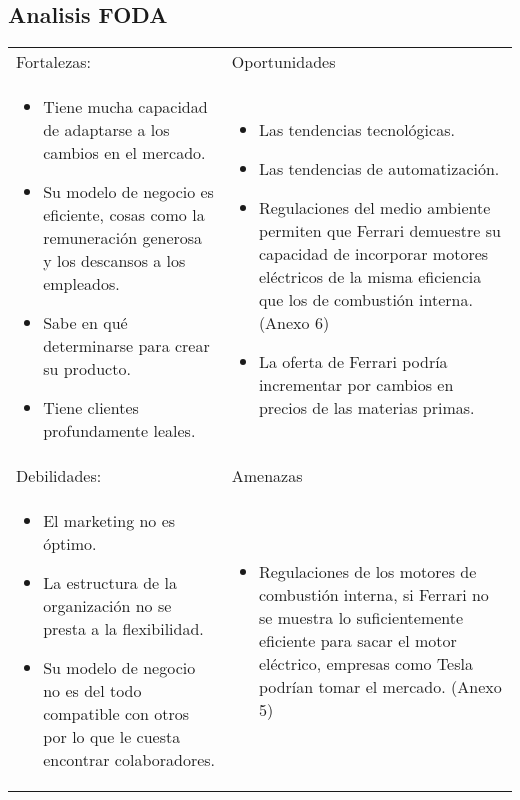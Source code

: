 \documentclass{article}
\begin{document}
\subsection{Analisis FODA}
\begin{center}
    \begin{tabular}{ |p{8cm}|p{8cm}| }
        \hline
            Fortalezas: & Oportunidades \\
            \begin{itemize}
                \item Tiene mucha capacidad de adaptarse a los cambios en el mercado.
                \item Su modelo de negocio es eficiente, cosas como la remuneración generosa y los descansos a los empleados.
                \item Sabe en qué determinarse para crear su producto. 
                \item Tiene clientes profundamente leales.
            \end{itemize} & 
            \begin{itemize}
                \item Las tendencias tecnológicas.
                \item Las tendencias de automatización.
                \item Regulaciones del medio ambiente permiten que Ferrari demuestre su capacidad de incorporar motores eléctricos de la misma eficiencia que los de combustión interna. (Anexo 6)
                \item La oferta de Ferrari podría incrementar por cambios en precios de las materias primas.
            \end{itemize} \\ 
        \hline
            Debilidades: & Amenazas \\ 
            \begin{itemize}
                \item El marketing no es óptimo. 
                \item La estructura de la organización no se presta a la flexibilidad. 
                \item Su modelo de negocio no es del todo compatible con otros por lo que le cuesta encontrar colaboradores.
            \end{itemize} & 
            \begin{itemize}
                \item Regulaciones de los motores de combustión interna, si Ferrari no se muestra lo suficientemente eficiente para sacar el motor eléctrico, empresas como Tesla podrían tomar el mercado. (Anexo 5)

\end{itemize}
\end{tabular}
\end{center}
\end{document}
